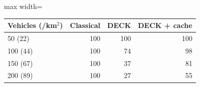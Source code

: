 \begin{adjustbox}{max width=\linewidth}
\begin{tabular}{lrrr}
\toprule
Vehicles (/km$^2$) & Classical & DECK & DECK + cache \\
\midrule
50 (22) & 100 & 100 & 100 \\
100 (44) & 100 & 74 & 98 \\
150 (67) & 100 & 37 & 81 \\
200 (89) & 100 & 27 & 55 \\
\bottomrule
\end{tabular}
\end{adjustbox}
\par{}
